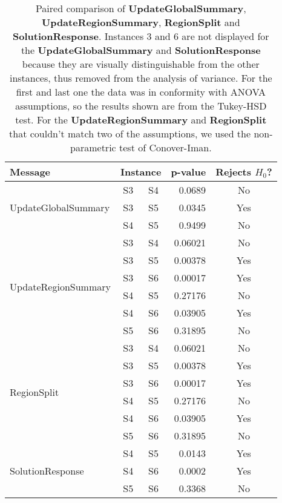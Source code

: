 \documentclass[preprint,12pt]{elsarticle}
\begin{document}
\begin{table}
    \centering
    \caption{Paired comparison of \textbf{UpdateGlobalSummary}, \textbf{UpdateRegionSummary}, \textbf{RegionSplit} and \textbf{SolutionResponse}. Instances 3 and 6 are not displayed for the \textbf{UpdateGlobalSummary} and \textbf{SolutionResponse} because they are visually distinguishable from the other instances, thus removed from the analysis of variance. For the first and last one the data was in conformity with ANOVA assumptions, so the results shown are from the Tukey-HSD test. For the \textbf{UpdateRegionSummary} and \textbf{RegionSplit} that couldn't match two of the assumptions, we used the non-parametric test of Conover-Iman.}
    \begin{tabular}{lccrc}
    \toprule
    \textbf{Message}    & \multicolumn{2}{c}{\textbf{Instance}} & \textbf{p-value}  & \textbf{Rejects $H_0$?} \\
    \midrule
    \multirow{3}{*}{UpdateGlobalSummary}    & S3   &  S4  & 0.0689 &  No \\
                                            & S3   &  S5  & 0.0345 &  Yes \\
                                            & S4   &  S5  & 0.9499 &  No \\
    \midrule
    \multirow{6}{*}{UpdateRegionSummary}    & S3 &    S4 &  0.06021 &  No  \\
                                            & S3 &    S5 &  0.00378 &  Yes \\
                                            & S3 &    S6 &  0.00017 &  Yes \\
                                            & S4 &    S5 &  0.27176 &  No  \\
                                            & S4 &    S6 &  0.03905 &  Yes \\
                                            & S5 &    S6 &  0.31895 &  No  \\
    \midrule
    \multirow{6}{*}{RegionSplit}    & S3  &  S4  &  0.06021  &  No \\
                                    & S3  &  S5  &  0.00378  &  Yes \\
                                    & S3  &  S6  &  0.00017  &  Yes \\
                                    & S4  &  S5  &  0.27176  &  No \\
                                    & S4  &  S6  &  0.03905  &  Yes \\
                                    & S5  &  S6  &  0.31895  &  No \\
    \midrule
    \multirow{3}{*}{SolutionResponse}   & S4  &  S5 &  0.0143 & Yes \\
                                        & S4  &  S6 &  0.0002 & Yes  \\
                                        & S5  &  S6 &  0.3368 & No \\
    \bottomrule
    \end{tabular}
    \label{tab:multicomp_results}
\end{table}
\end{document}
